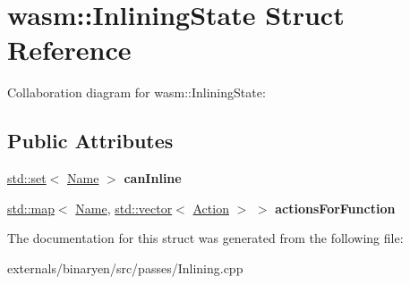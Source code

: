 \hypertarget{structwasm_1_1_inlining_state}{}\section{wasm\+:\+:Inlining\+State Struct Reference}
\label{structwasm_1_1_inlining_state}


Collaboration diagram for wasm\+:\+:Inlining\+State\+:
\subsection*{Public Attributes}
\begin{DoxyCompactItemize}
\item 
\mbox{\label{structwasm_1_1_inlining_state_adf0d238f9d8729bcaa1c29152e42d2de}} 
\mbox{\hyperlink{classstd_1_1set}{std\+::set}}$<$ \mbox{\hyperlink{structwasm_1_1_name}{Name}} $>$ {\bfseries can\+Inline}
\item 
\mbox{\label{structwasm_1_1_inlining_state_a92e269f5f63e4faa810105bc5d54955e}} 
\mbox{\hyperlink{classstd_1_1map}{std\+::map}}$<$ \mbox{\hyperlink{structwasm_1_1_name}{Name}}, \mbox{\hyperlink{classstd_1_1vector}{std\+::vector}}$<$ \mbox{\hyperlink{structwasm_1_1_action}{Action}} $>$ $>$ {\bfseries actions\+For\+Function}
\end{DoxyCompactItemize}


The documentation for this struct was generated from the following file\+:\begin{DoxyCompactItemize}
\item 
externals/binaryen/src/passes/Inlining.\+cpp\end{DoxyCompactItemize}
